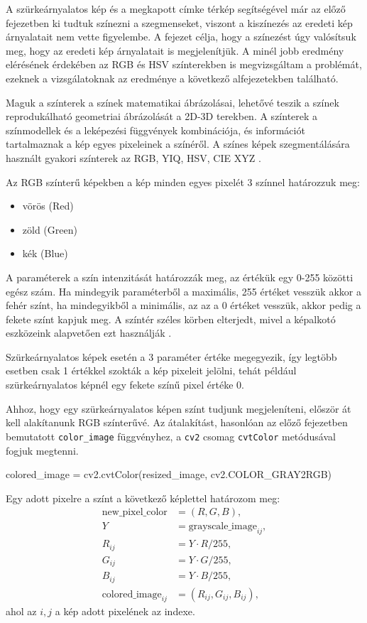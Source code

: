 
A szürkeárnyalatos kép és a megkapott címke térkép segítségével már az előző fejezetben ki tudtuk színezni a szegmenseket, viszont a kiszínezés az eredeti kép árnyalatait nem vette figyelembe. A fejezet célja, hogy a színezést úgy valósítsuk meg, hogy az eredeti kép árnyalatait is megjelenítjük. A minél jobb eredmény elérésének érdekében az RGB és HSV színterekben is megvizsgáltam a problémát, ezeknek a vizsgálatoknak az eredménye a következő alfejezetekben található.

Maguk a színterek a színek matematikai ábrázolásai, lehetővé teszik a színek reprodukálható geometriai ábrázolását a 2D-3D terekben. A színterek a színmodellek és a leképezési függvények kombinációja, és információt tartalmaznak a kép egyes pixeleinek a színéről. A színes képek szegmentálására használt gyakori színterek az RGB, YIQ, HSV, CIE XYZ \cite{colorspaces}.


Az RGB színterű képekben a kép minden egyes pixelét 3 színnel határozzuk meg:
\begin{itemize}
\item vörös (Red)
\item zöld (Green)
\item kék (Blue)
\end{itemize}
A paraméterek a szín intenzitását határozzák meg, az értékük egy 0-255 közötti egész szám. Ha mindegyik paraméterből a maximális, 255 értéket vesszük akkor a fehér színt, ha mindegyikből a minimális, az az a 0 értéket vesszük, akkor pedig a fekete színt kapjuk meg. A színtér széles körben elterjedt, mivel a képalkotó eszközeink alapvetően ezt használják \cite{colorspaces}.

Szürkeárnyalatos képek esetén a 3 paraméter értéke megegyezik, így legtöbb esetben csak 1 értékkel szokták a kép pixeleit jelölni, tehát például szürkeárnyalatos képnél egy fekete színű pixel értéke 0.

Ahhoz, hogy egy szürkeárnyalatos képen színt tudjunk megjeleníteni, először át kell alakítanunk RGB színterűvé. Az átalakítást, hasonlóan az előző fejezetben bemutatott \texttt{color\_image} függvényhez, a \texttt{cv2} csomag \texttt{cvtColor} metódusával fogjuk megtenni.
\begin{python}
colored_image = cv2.cvtColor(resized_image, cv2.COLOR_GRAY2RGB)
\end{python}

Egy adott pixelre a színt a következő képlettel határozom meg:
\begin{align*}
 \text{new\_pixel\_color} & = (R, G, B), \\
 Y & = \text{grayscale\_image}_{ij},\\
 R_{ij} & = Y \cdot R / 255, \\
 G_{ij} & = Y \cdot G / 255, \\
 B_{ij} & = Y \cdot B / 255, \\
 \text{colored\_image}_{ij} & = (R_{ij}, G_{ij}, B_{ij}),
\end{align*}
ahol az $i,j$ a kép adott pixelének az indexe.

